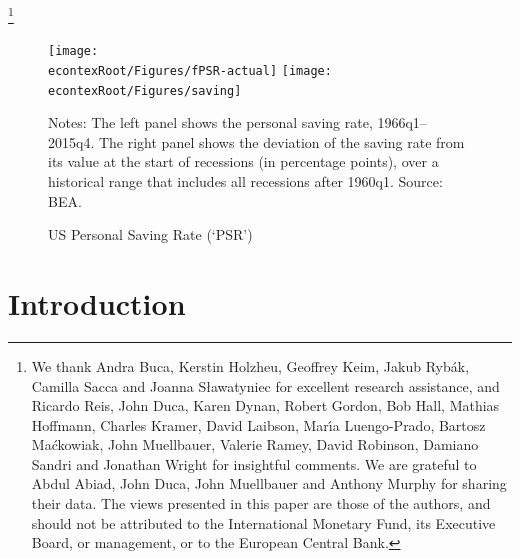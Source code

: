 \documentclass[titlepage]{\econtex}
\begin{document}
\begin{authorsinfo}
\end{authorsinfo}

\thanks{We thank Andra Buca, Kerstin Holzheu, Geoffrey Keim, Jakub Ryb\'ak, Camilla Sacca and Joanna S{\l}awatyniec for excellent research assistance, and Ricardo Reis, John Duca, Karen Dynan, Robert Gordon, Bob Hall, Mathias Hoffmann, Charles Kramer, David Laibson, Mar\'\i a Luengo-Prado, Bartosz Ma\'ckowiak, John Muellbauer, Valerie Ramey, David Robinson, Damiano Sandri and Jonathan Wright for insightful comments. We are grateful to Abdul Abiad, John Duca, John Muellbauer and Anthony Murphy for sharing their data. The views presented in this paper are those of the authors, and should not be attributed to the International Monetary Fund, its Executive Board, or management, or to the European Central Bank.}

\titlepagefinish


\setcounter{page}{1}

\hypertarget{PRSintro}{}
\begin{figure}
\caption{US Personal Saving Rate (`PSR')}
\label{fig:PSR}
\texttt{[image: \\econtexRoot/Figures/fPSR-actual]}
\texttt{[image: \\econtexRoot/Figures/saving]}

\footnotesize Notes: The left panel shows the personal saving rate, 1966q1--2015q4. The right panel shows the deviation of the saving rate from its value at the start of recessions (in percentage points), over a historical range that includes all recessions after 1960q1. Source: BEA.
\end{figure}



\section{Introduction}
\end{document}
